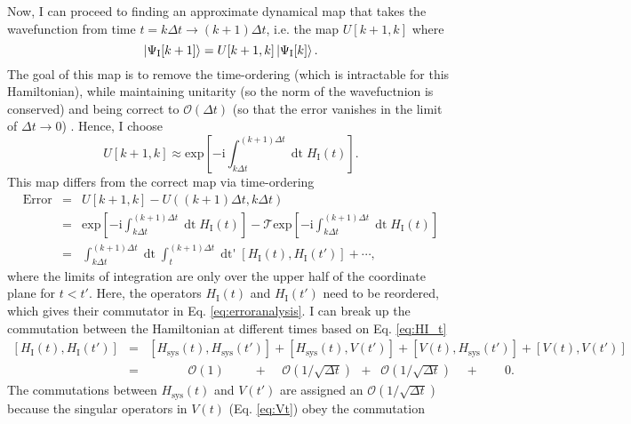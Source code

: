 \documentclass[%
 onecolumn,
 notitlepage,
 longbibliography,
 amsmath,amssymb,
 aps,
 pra,
 10pt,
]{revtex4-1}
\begin{document}
Now, I can proceed to finding an approximate dynamical map that takes the wavefunction from time $t=k\Delta t\rightarrow (k+1)\Delta t$, i.e. the map $U[k+1,k]$ where
\begin{equation}
\ket{\Psi_\textrm{I}[k+1]} = U[k+1,k] \ket{\Psi_\textrm{I}[k]}.
\end{equation}
The goal of this map is to remove the time-ordering (which is intractable for this Hamiltonian), while maintaining unitarity (so the norm of the wavefuctnion is conserved) and being correct to $\mathcal{O}(\Delta t)$ (so that the error vanishes in the limit of $\Delta t\rightarrow 0$) \cite{fischer2017scattering}. Hence, I choose
\begin{equation}
U[k+1,k] \approx \textrm{exp}\left[-\textrm{i}\int_{k\Delta t}^{(k+1)\Delta t}\mathop{\textrm{d}t} H_\textrm{I}(t)\right].
\end{equation}
This map differs from the correct map via time-ordering
\begin{eqnarray}
\textrm{Error}&=&U[k+1,k]-U((k+1)\Delta t, k\Delta t)\\
&=&\textrm{exp}\left[-\textrm{i}\int_{k\Delta t}^{(k+1)\Delta t}\mathop{\textrm{d}t} H_\textrm{I}(t)\right] - \mathcal{T} \textrm{exp}\left[-\textrm{i}\int_{k\Delta t}^{(k+1)\Delta t}\mathop{\textrm{d}t} H_\textrm{I}(t)\right]\\
&=&\int_{k\Delta t}^{(k+1)\Delta t}\mathop{\textrm{d}t}\int_{t}^{(k+1)\Delta t}\mathop{\textrm{d}t'}\left[H_\textrm{I}(t),H_\textrm{I}(t')\right] + \cdots,\label{eq:erroranalysis}
\end{eqnarray}
where the limits of integration are only over the upper half of the coordinate plane for $t<t'$. Here, the operators $H_\textrm{I}(t)$ and $H_\textrm{I}(t')$ need to be reordered, which gives their commutator in Eq. \ref{eq:erroranalysis}. I can break up the commutation between the Hamiltonian at different times based on Eq. \ref{eq:HI_t}
\begin{eqnarray}
\left[H_\textrm{I}(t),H_\textrm{I}(t')\right]&=&\left[H_\textrm{sys}(t),H_\textrm{sys}(t')\right]+\left[H_\textrm{sys}(t),V(t')\right]+\left[V(t),H_\textrm{sys}(t')\right]+\left[V(t),V(t')\right]\\
&=& \qquad\quad\,\mathcal{O}(1)\quad\quad\;+\;\;\;\;\mathcal{O}(1/\sqrt{\Delta t})\;\,+\;\;\mathcal{O}(1/\sqrt{\Delta t})\;\;\;\:+\quad \quad 0.
\end{eqnarray}
The commutations between $H_\textrm{sys}(t)$ and $V(t')$ are assigned an $\mathcal{O}(1/\sqrt{\Delta t})$ because the singular operators in $V(t)$ (Eq. \ref{eq:Vt}) obey the commutation
\end{document}
